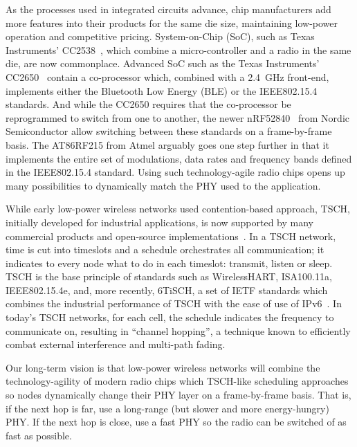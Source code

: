 \documentclass[sensors,article,submit,moreauthors,pdftex]{Definitions/mdpi}
\begin{document}
As the processes used in integrated circuits advance, chip manufacturers add more features into their products for the same die size,
    maintaining low-power operation and
    competitive pricing.
System-on-Chip (SoC), such as Texas Instruments' CC2538~\cite{datasheet_cc2538}, which combine a micro-controller and a radio in the same die, are now commonplace.
Advanced SoC such as the Texas Instruments' CC2650~\cite{datasheet_cc2650} contain a co-processor which, combined with a 2.4~GHz front-end, implements either the Bluetooth Low Energy (BLE) or the IEEE802.15.4 standards.
And while the CC2650 requires that the co-processor be reprogrammed to switch from one to another,
    the newer nRF52840~\cite{datasheet_nrf52840} from Nordic Semiconductor allow switching between these standards on a frame-by-frame basis.
The AT86RF215 from Atmel arguably goes one step further in that it implements the entire set of modulations, data rates and frequency bands defined in the IEEE802.15.4 standard.
Using such technology-agile radio chips opens up many possibilities to dynamically match the PHY used to the application.


While early low-power wireless networks used contention-based approach,
    TSCH, initially developed for industrial applications,
    is now supported by many commercial products and open-source implementations~\cite{watteyne16industrial}.
In a TSCH network, time is cut into timeslots and a schedule orchestrates all communication;
    it indicates to every node what to do in each timeslot: transmit, listen or sleep.
TSCH is the base principle of standards such as WirelessHART, ISA100.11a, IEEE802.15.4e, and, more recently, 6TiSCH, a set of IETF standards which combines the industrial performance of TSCH with the ease of use of IPv6~\cite{draft-ietf-6tisch-msf}.
In today's TSCH networks, for each cell, the schedule indicates the frequency to communicate on, resulting in ``channel hopping'', a technique known to efficiently combat external interference and multi-path fading.


Our long-term vision is that low-power wireless networks will combine the technology-agility of modern radio chips which TSCH-like scheduling approaches so nodes dynamically change their PHY layer on a frame-by-frame basis.
That is, if the next hop is far,   use a long-range (but slower and more energy-hungry) PHY.
         If the next hop is close, use a fast PHY so the radio can be switched of as fast as possible.
\end{document}
